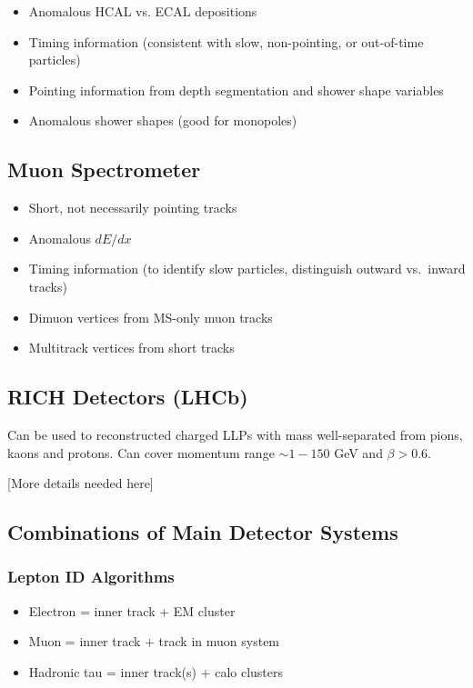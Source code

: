\begin{itemize}
\item Anomalous HCAL vs. ECAL depositions
\item Timing information (consistent with slow, non-pointing, or out-of-time particles)
\item Pointing information from depth segmentation and shower shape variables
\item Anomalous shower shapes (good for monopoles)
\end{itemize}

\subsection{Muon Spectrometer}
\begin{itemize}
\item Short, not necessarily pointing tracks
\item Anomalous $dE/dx$
\item Timing information (to identify slow particles, distinguish outward vs.~inward tracks)
\item Dimuon vertices from MS-only muon tracks
\item Multitrack vertices from short tracks
\end{itemize}

\subsection{RICH Detectors (LHCb)}

Can be used to reconstructed charged LLPs with mass well-separated from pions, kaons and protons. Can cover momentum range $\sim1-150$ GeV and $\beta>0.6$.

[More details needed here]

\subsection{Combinations of Main Detector Systems}
\subsubsection{Lepton ID Algorithms}

\begin{itemize}
\item Electron = inner track + EM cluster
\item Muon = inner track + track in muon system
\item Hadronic tau = inner track(s) + calo clusters
\end{itemize}

